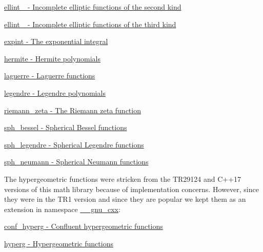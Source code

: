 \begin{DoxyItemize}
\item \hyperlink{group__mathsf__std_gad64cb9babb7837d585912b1a94b2cb7d}{ellint\+\_ -\/ Incomplete elliptic functions of the second kind}
\item \hyperlink{group__mathsf__std_gaac0240d1e7e401e652b9d1adf4c7e029}{ellint\+\_ -\/ Incomplete elliptic functions of the third kind}
\item \hyperlink{group__mathsf__std_ga0e9ac717a106ef54184b5f058c451782}{expint -\/ The exponential integral}
\item \hyperlink{group__mathsf__std_ga8bd1626f1e3f7256c4fd13579f881183}{hermite -\/ Hermite polynomials}
\item \hyperlink{group__mathsf__std_ga9d7b24a11dad27690387405548973ef9}{laguerre -\/ Laguerre functions}
\item \hyperlink{group__mathsf__std_gad06811f4e139b0ba84235c1f0d34d86e}{legendre -\/ Legendre polynomials}
\item \hyperlink{group__mathsf__std_gac4ef9d52ee583c77937c3a420b7c72ca}{riemann\+\_\+zeta -\/ The Riemann zeta function}
\item \hyperlink{group__mathsf__std_gad125841d7c85e461cb8954952e3a17c8}{sph\+\_\+bessel -\/ Spherical Bessel functions}
\item \hyperlink{group__mathsf__std_gacef0d41a7ce572a9ace3437498794ed0}{sph\+\_\+legendre -\/ Spherical Legendre functions}
\item \hyperlink{group__mathsf__std_ga01cdd716aaca8ff3c08f307800fd5220}{sph\+\_\+neumann -\/ Spherical Neumann functions}
\end{DoxyItemize}

The hypergeometric functions were stricken from the T\+R29124 and C++17 versions of this math library because of implementation concerns. However, since they were in the T\+R1 version and since they are popular we kept them as an extension in namespace {\ttfamily \hyperlink{namespace____gnu__cxx}{\+\_\+\+\_\+gnu\+\_\+cxx}\+:} 
\begin{DoxyItemize}
\item \hyperlink{group__mathsf__gnu_ga4d01e85e7d295afca5d9f8b6c68f19cc}{conf\+\_\+hyperg -\/ Confluent hypergeometric functions}
\item \hyperlink{group__mathsf__gnu_ga374198e4076f9e23f3878ca3af70e6da}{hyperg -\/ Hypergeometric functions}
\end{DoxyItemize}

